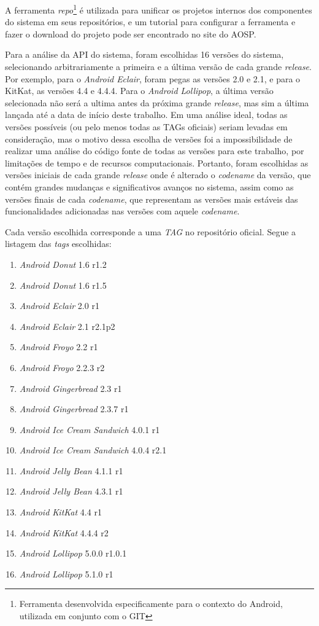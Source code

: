 A ferramenta \textit{repo}\footnote{Ferramenta desenvolvida especificamente para o contexto do Android, utilizada em conjunto com o GIT}  é utilizada para unificar os projetos internos dos componentes do sistema em seus repositórios, e um tutorial para configurar a ferramenta e fazer o download do projeto pode ser encontrado no site do AOSP.

Para a análise da API do sistema, foram escolhidas 16 versões do sistema, selecionando arbitrariamente a primeira e a última versão de cada grande \textit{release}. Por exemplo, para o \textit{Android Eclair}, foram pegas as versões 2.0 e 2.1, e para o KitKat, as versões 4.4 e 4.4.4. Para o \textit{Android Lollipop}, a última versão selecionada não será a ultima antes da próxima grande \textit{release}, mas sim a última lançada até a data de início deste trabalho. Em uma análise ideal, todas as versões possíveis (ou pelo menos todas as TAGs oficiais) seriam levadas em consideração, mas o motivo dessa escolha de versões foi a impossibilidade de realizar uma análise do código fonte de todas as versões para este trabalho, por limitações de tempo e de recursos computacionais. Portanto, foram escolhidas as versões iniciais de cada grande \textit{release} onde é alterado o \textit{codename} da versão, que contém grandes mudanças e significativos avanços no sistema, assim como as versões finais de cada \textit{codename}, que representam as versões mais estáveis das funcionalidades adicionadas nas versões com aquele \textit{codename}.
 
Cada versão escolhida corresponde a uma \textit{TAG} no repositório oficial. Segue a listagem das \textit{tags} escolhidas:
\begin{enumerate}
\item \textit{Android Donut} 1.6 r1.2
\item \textit{Android Donut} 1.6 r1.5
\item \textit{Android Eclair} 2.0 r1
\item \textit{Android Eclair} 2.1 r2.1p2
\item \textit{Android Froyo} 2.2 r1
\item \textit{Android Froyo} 2.2.3 r2
\item \textit{Android Gingerbread} 2.3 r1
\item \textit{Android Gingerbread} 2.3.7 r1
\item \textit{Android Ice Cream Sandwich} 4.0.1 r1
\item \textit{Android Ice Cream Sandwich} 4.0.4 r2.1
\item \textit{Android Jelly Bean} 4.1.1 r1
\item \textit{Android Jelly Bean} 4.3.1 r1
\item \textit{Android KitKat} 4.4 r1
\item \textit{Android KitKat} 4.4.4 r2
\item \textit{Android Lollipop} 5.0.0 r1.0.1
\item \textit{Android Lollipop} 5.1.0 r1
\end{enumerate}

